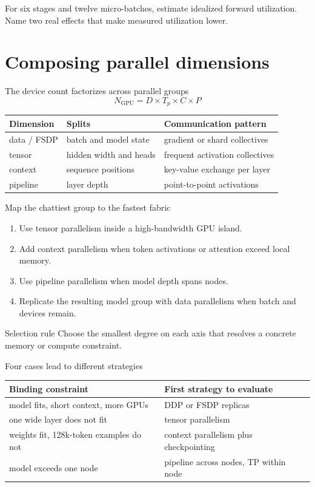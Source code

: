 \documentclass[handout]{beamer}
\begin{document}
  {For six stages and twelve micro-batches, estimate idealized forward utilization. Name two real effects that make measured utilization lower.}

\section{Composing parallel dimensions}

\begin{frame}{The device count factorizes across parallel groups}
  \[
    N_{\text{GPU}}=D\times T_p\times C\times P
  \]
  \small
  \begin{tabular}{lll}
    \toprule
    Dimension & Splits & Communication pattern \\
    \midrule
    data / FSDP & batch and model state & gradient or shard collectives \\
    tensor & hidden width and heads & frequent activation collectives \\
    context & sequence positions & key-value exchange per layer \\
    pipeline & layer depth & point-to-point activations \\
    \bottomrule
  \end{tabular}
\end{frame}

\begin{frame}{Map the chattiest group to the fastest fabric}
  \begin{enumerate}
    \setlength{\itemsep}{7pt}
    \item Use tensor parallelism inside a high-bandwidth GPU island.
    \item Add context parallelism when token activations or attention exceed local memory.
    \item Use pipeline parallelism when model depth spans nodes.
    \item Replicate the resulting model group with data parallelism when batch and devices remain.
  \end{enumerate}
  \begin{alertblock}{Selection rule}
    Choose the smallest degree on each axis that resolves a concrete memory or compute constraint.
  \end{alertblock}
\end{frame}

\begin{frame}{Four cases lead to different strategies}
  \small
  \begin{tabular}{p{.41\linewidth}p{.49\linewidth}}
    \toprule
    Binding constraint & First strategy to evaluate \\
    \midrule
    model fits, short context, more GPUs & DDP or FSDP replicas \\
    one wide layer does not fit & tensor parallelism \\
    weights fit, 128k-token examples do not & context parallelism plus checkpointing \\
    model exceeds one node & pipeline across nodes, TP within node \\
    \bottomrule
  \end{tabular}
\end{frame}
\end{document}
